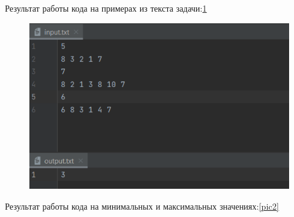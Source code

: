 \newpage
Результат работы кода на примерах из текста задачи:\ref{pic1}
\begin{figure}[H]
        \label{pic1}
	\begin{center}
		\includegraphics[scale=0.7]{fig/5_text.png}
	\end{center}
\end{figure}
\newline
Результат работы кода на минимальных и максимальных значениях:\ref{pic2}
